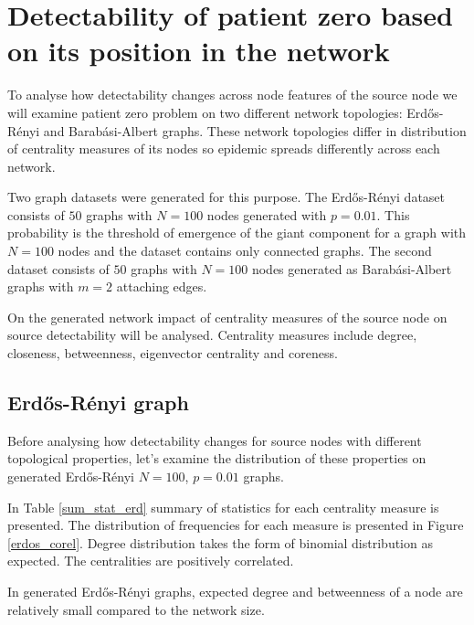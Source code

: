 \documentclass[times, utf8, diplomski]{fer}
\begin{document}
\section{Detectability of patient zero based on its position in the network}

To analyse  how detectability changes across node features of the source node we will examine patient zero problem on two different network topologies: Erd{\H{o}}s-R{\'{e}}nyi and Barab\'{a}si-Albert graphs. These network topologies differ in distribution of centrality measures of its nodes so  epidemic spreads differently across each  network.

Two graph datasets were generated for this purpose. The Erd{\H{o}}s-R{\'{e}}nyi dataset consists of $50$ graphs with $N = 100$ nodes generated with $p=0.01$. This probability is the threshold of emergence of the giant component for a graph with $N = 100$ nodes  and the dataset contains only connected graphs. The second dataset consists of $50$ graphs with $N = 100$ nodes generated as Barab\'{a}si-Albert graphs with $m = 2$ attaching edges.

On the generated network impact of centrality measures of the source node  on source detectability will be analysed. Centrality measures include degree, closeness, betweenness, eigenvector centrality and coreness.

\subsection{Erd{\H{o}}s-R{\'{e}}nyi graph}

Before analysing how detectability changes for source nodes with different topological properties, let's examine the distribution of these properties on generated Erd{\H{o}}s-R{\'{e}}nyi $N = 100$, $p = 0.01$ graphs.

In Table \ref{sum_stat_erd} summary of statistics for each centrality measure is presented. The distribution of frequencies for each measure is presented in Figure \ref{erdos_corel}. Degree distribution takes the form of binomial distribution as expected. The centralities are positively correlated. 

In generated  Erd{\H{o}}s-R{\'{e}}nyi graphs, expected degree and betweenness of a node are relatively small compared to the network size. 
\end{document}
